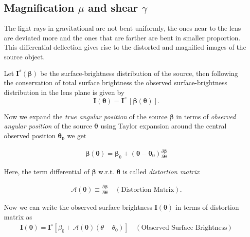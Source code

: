 \subsection{Magnification $\mu$ and shear $\gamma$ }
  The light rays in gravitational are not bent uniformly, the ones near to the
  lens are deviated more and the ones that are farther are bent in smaller
  proportion. This differential deflection gives rise to the distorted and
  magnified images of the source object.

  Let $\textbf{I}^s(\boldsymbol{\beta} )$  be the surface-brightness distribution
  of the source, then following the conservation of total surface brightness
  the observed surface-brightness distribution in the lens
  plane is given by
  \begin{equation}\label{[eq:I_theta]}
    \boldsymbol{I(\theta)} =  \textbf{I}^s \ [\boldsymbol{\beta}(\boldsymbol{\theta})].
  \end{equation}


  Now we expand the \textit{true angular position} of the source $\boldsymbol{\beta}$
  in terms of \textit{observed angular position} of the source $\boldsymbol{\theta}$
  using Taylor expansion around the central observed position $\boldsymbol{\theta_0}$
  we get

  \begin{eqnarray}\label{[eq:beta_taylor]}
    \boldsymbol{\beta}(\boldsymbol{\theta} ) = \boldsymbol{\beta}_0 + ( \boldsymbol{\theta} - \boldsymbol{\theta}_0 ) \frac{\partial\boldsymbol{\beta} }{\partial\boldsymbol{\theta}  }
  \end{eqnarray}

  Here, the term differential of $\boldsymbol{\beta}$ w.r.t. $\boldsymbol{\theta}$ is called \textit{distortion matrix}

  \begin{eqnarray}\label{[eq:dist_matrix]}
    \boxed{ \mathscr{A}(\boldsymbol{\theta} ) \equiv \frac{\partial \boldsymbol{\beta} }{ \partial \boldsymbol{\theta} }} \quad (\text{Distortion Matrix}).
  \end{eqnarray}

  Now we can write the observed surface brightness $\boldsymbol{I(\theta)}$ in terms of
  distortion matrix as
  \begin{eqnarray}\label{[eq:I_taylor]}
    \boxed{\boldsymbol{I}(\boldsymbol{\theta}) = \boldsymbol{I}^s[\beta_0 + \mathscr{A}(\boldsymbol{\theta}) (\theta - \theta_0 ) ]} \quad (\text{Observed Surface Brightness})
  \end{eqnarray}

